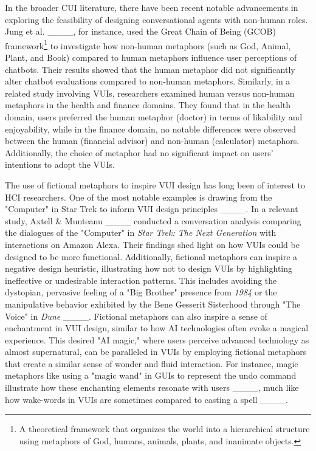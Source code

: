 In the broader CUI literature, there have been recent notable advancements in exploring the feasibility of designing conversational agents with non-human roles. Jung et al. ____, for instance, used the Great Chain of Being (GCOB) framework\footnote{A theoretical framework that organizes the world into a hierarchical structure using metaphors of God, humans, animals, plants, and inanimate objects.} to investigate how non-human metaphors (such as God, Animal, Plant, and Book) compared to human metaphors influence user perceptions of chatbots. Their results showed that the human metaphor did not significantly alter chatbot evaluations compared to non-human metaphors. Similarly, in a related study involving VUIs, researchers examined human versus non-human metaphors in the health and finance domains. They found that in the health domain, users preferred the human metaphor (doctor) in terms of likability and enjoyability, while in the finance domain, no notable differences were observed between the human (financial advisor) and non-human (calculator) metaphors. Additionally, the choice of metaphor had no significant impact on users’ intentions to adopt the VUIs.

The use of fictional metaphors to inspire VUI design has long been of interest to HCI researchers. One of the most notable examples is drawing from the "Computer" in Star Trek to inform VUI design principles ____. In a relevant study, Axtell \& Munteanu ____ conducted a conversation analysis comparing the dialogues of the "Computer" in \textit{Star Trek: The Next Generation} with interactions on Amazon Alexa. Their findings shed light on how VUIs could be designed to be more functional. Additionally, fictional metaphors can inspire a negative design heuristic, illustrating how not to design VUIs by highlighting ineffective or undesirable interaction patterns. This includes avoiding the dystopian, pervasive feeling of a "Big Brother" presence from \textit{1984} or the manipulative behavior exhibited by the Bene Gesserit Sisterhood through "The Voice" in \textit{Dune} ____. Fictional metaphors can also inspire a sense of enchantment in VUI design, similar to how AI technologies often evoke a magical experience. This desired "AI magic," where users perceive advanced technology as almost supernatural, can be paralleled in VUIs by employing fictional metaphors that create a similar sense of wonder and fluid interaction. For instance, magic metaphors like using a "magic wand" in GUIs to represent the undo command illustrate how these enchanting elements resonate with users ____, much like how wake-words in VUIs are sometimes compared to casting a spell ____.


